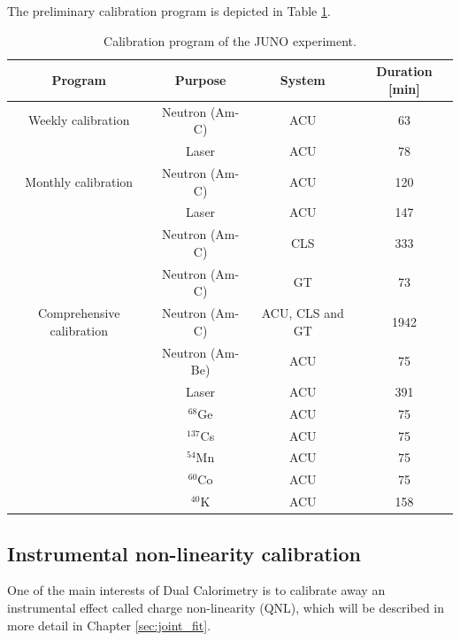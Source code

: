 \documentclass[../main.tex]{subfiles}
\begin{document}
The preliminary calibration program is depicted in Table \ref{tab:juno:calib_prog}.

\begin{table}[ht]
  \centering
  \begin{tabular}{c c c c}
    \hline
    Program & Purpose & System & Duration [min] \\
    \hline
    Weekly calibration & Neutron (Am-C) & ACU & 63 \\
                       & Laser & ACU & 78  \\
                       \hline
    Monthly calibration & Neutron (Am-C) & ACU & 120 \\
                        & Laser  & ACU  & 147 \\
                        & Neutron (Am-C) & CLS & 333 \\
                        & Neutron (Am-C) & GT  & 73  \\
                        \hline
    Comprehensive calibration & Neutron (Am-C) & ACU, CLS and GT & 1942 \\
                              & Neutron (Am-Be) & ACU & 75 \\
                              & Laser & ACU & 391 \\
                              & $^{68}$Ge & ACU & 75 \\
                              & $^{137}$Cs & ACU & 75 \\
                              & $^{54}$Mn & ACU & 75 \\
                              & $^{60}$Co & ACU & 75 \\
                              & $^{40}$K & ACU & 158 \\
    \hline
  \end{tabular}
  \caption{Calibration program of the JUNO experiment.}
  \label{tab:juno:calib_prog}
\end{table}

\subsection{Instrumental non-linearity calibration}
\label{sec:juno:instr_nl}

One of the main interests of Dual Calorimetry is to calibrate away an instrumental effect called charge non-linearity (QNL), which will be described in more detail in Chapter \ref{sec:joint_fit}.
\end{document}

